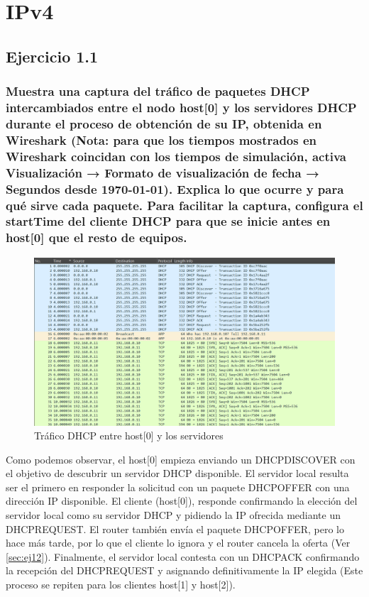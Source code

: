 \chapter{IPv4}
\label{chap:ipv4}

\section{Ejercicio 1.1}

\subsection{Muestra una captura del tráfico de paquetes DHCP intercambiados entre el nodo host[0] y los servidores
DHCP durante el proceso de obtención de su IP, obtenida en Wireshark (Nota: para que los tiempos mostrados
en Wireshark coincidan con los tiempos de simulación, activa Visualización → Formato de visualización de fecha
→ Segundos desde 1970-01-01). Explica lo que ocurre y para qué sirve cada paquete. Para facilitar la captura,
configura el startTime del cliente DHCP para que se inicie antes en host[0] que el resto de equipos.}

\begin{figure}[H]
    \centering
    \includegraphics[width=135mm, scale=0.75]{imaxes/captura_ejer1_1.png}
    \caption{Tráfico DHCP entre host[0] y los servidores}
    \label{fig:captura_host0}
\end{figure}

Como podemos observar, el host[0] empieza enviando un DHCPDISCOVER con el objetivo de descubrir un servidor DHCP disponible. 
El servidor local resulta ser el primero en responder la solicitud con un paquete DHCPOFFER con una dirección IP disponible. El cliente (host[0]),
responde confirmando la elección del servidor local como su servidor DHCP y pidiendo la IP ofrecida mediante un DHCPREQUEST. El router también envía el paquete DHCPOFFER, pero lo hace más tarde, por lo que el cliente lo ignora y el router cancela la oferta (Ver \ref{sec:ej12}). Finalmente, el servidor local contesta con un DHCPACK confirmando la recepción del DHCPREQUEST y asignando definitivamente la IP elegida (Este proceso se repiten para los clientes host[1] y host[2]).

